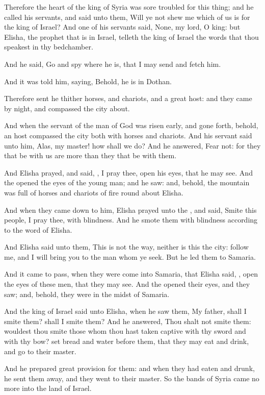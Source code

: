 \verse Therefore the heart of the king of Syria was sore troubled for this thing; and he called his servants, and said unto them, Will ye not shew me which of us is for the king of Israel?  \verse And one of his servants said, None, my lord, O king: but Elisha, the prophet that is in Israel, telleth the king of Israel the words that thou speakest in thy bedchamber.

\verse And he said, Go and spy where he is, that I may send and fetch him.

And it was told him, saying, Behold, he is in Dothan.

\verse Therefore sent he thither horses, and chariots, and a great host: and they came by night, and compassed the city about.

\verse And when the servant of the man of God was risen early, and gone forth, behold, an host compassed the city both with horses and chariots. And his servant said unto him, Alas, my master! how shall we do?  \verse And he answered, Fear not: for they that be with us are more than they that be with them.

\verse And Elisha prayed, and said, \LORD, I pray thee, open his eyes, that he may see. And the \LORD opened the eyes of the young man; and he saw: and, behold, the mountain was full of horses and chariots of fire round about Elisha.

\verse And when they came down to him, Elisha prayed unto the \LORD, and said, Smite this people, I pray thee, with blindness. And he smote them with blindness according to the word of Elisha.

\verse And Elisha said unto them, This is not the way, neither is this the city: follow me, and I will bring you to the man whom ye seek. But he led them to Samaria.

\verse And it came to pass, when they were come into Samaria, that Elisha said, \LORD, open the eyes of these men, that they may see. And the \LORD opened their eyes, and they saw; and, behold, they were in the midst of Samaria.

\verse And the king of Israel said unto Elisha, when he saw them, My father, shall I smite them? shall I smite them?  \verse And he answered, Thou shalt not smite them: wouldest thou smite those whom thou hast taken captive with thy sword and with thy bow? set bread and water before them, that they may eat and drink, and go to their master.

\verse And he prepared great provision for them: and when they had eaten and drunk, he sent them away, and they went to their master. So the bands of Syria came no more into the land of Israel.

